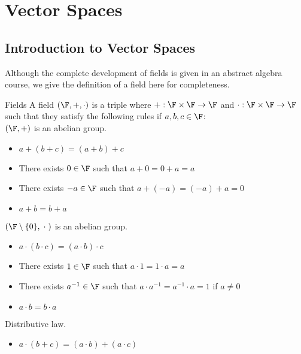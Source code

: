 \section{Vector Spaces}
\subsection{Introduction to Vector Spaces}
Although the complete development of fields is given in an abstract algebra course, we give the definition of a field here for completeness. 

\begin{defn}{Fields}{} A field $(\F,+,\cdot)$ is a triple where $+:\F\times\F\to\F$ and $\cdot:\F\times\F\to\F$ such that they satisfy the following rules if $a,b,c\in\F$: \\
$(\F,+)$ is an abelian group. 
\begin{itemize}
\item $a+(b+c)=(a+b)+c$
\item There exists $0\in\F$ such that $a+0=0+a=a$
\item There exists $-a\in\F$ such that $a+(-a)=(-a)+a=0$
\item $a+b=b+a$
\end{itemize}
$(\F\setminus\{0\},\;\cdot\;)$ is an abelian group. 
\begin{itemize}
\item $a\cdot(b\cdot c)=(a\cdot b)\cdot c$
\item There exists $1\in\F$ such that $a\cdot 1=1\cdot a=a$
\item There exists $a^{-1}\in\F$ such that $a\cdot a^{-1}=a^{-1}\cdot a=1$ if $a\neq 0$
\item $a\cdot b=b\cdot a$
\end{itemize}
Distributive law. 
\begin{itemize}
\item $a\cdot(b+c)=(a\cdot b)+(a\cdot c)$
\end{itemize}
\end{defn}

